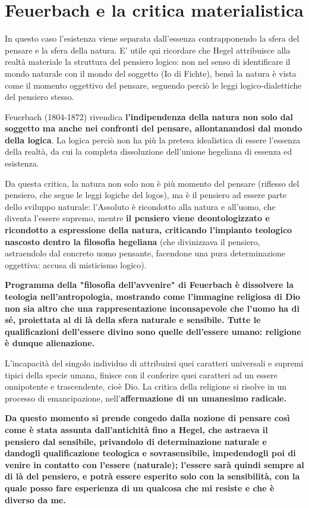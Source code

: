 \section{Feuerbach e la critica materialistica}

In questo caso l'esistenza viene separata dall'essenza contrapponendo la sfera del pensare e la sfera della natura. E' utile qui ricordare che Hegel attribuisce alla realtà materiale la struttura del pensiero logico: non nel senso di identificare il mondo naturale con il mondo del soggetto (Io di Fichte), bensì la natura è vista come il momento oggettivo del pensare, seguendo perciò le leggi logico-dialettiche del pensiero stesso.

Feuerbach (1804-1872) rivendica \textbf{l'indipendenza della natura non solo dal soggetto ma anche nei confronti del pensare, allontanandosi dal mondo della logica}. La logica perciò non ha più la pretesa idealistica di essere l'essenza della realtà, da cui la completa dissoluzione dell'unione hegeliana  di essenza ed esistenza.

Da questa critica, la natura non solo non è più momento del pensare (riflesso del pensiero, che segue le leggi logiche del logos), ma è il pensiero ad essere parte dello sviluppo naturale: l'Assoluto è ricondotto alla natura e all'uomo, che diventa l'essere supremo, mentre \textbf{il pensiero viene deontologizzato  e ricondotto a espressione della natura, criticando l'impianto teologico nascosto dentro la filosofia hegeliana }(che divinizzava il pensiero, astraendolo dal concreto uomo pensante, facendone una pura determinazione oggettiva: accusa di misticismo logico).

\textbf{Programma della "filosofia dell'avvenire" di Feuerbach  è dissolvere la teologia nell'antropologia, mostrando come l'immagine religiosa di Dio non sia altro che una rappresentazione inconsapevole che l'uomo ha di sé, proiettata al di là della sfera naturale e sensibile. Tutte le qualificazioni dell'essere divino sono quelle dell'essere umano: religione è dunque alienazione.}

L'incapacità del singolo individuo di attribuirsi quei caratteri universali e supremi tipici della specie umana, finisce con il conferire quei caratteri ad un essere onnipotente e trascendente, cioè Dio. La critica della religione si risolve in un processo di emancipazione, nell'\textbf{affermazione di un umanesimo radicale.}

\textbf{Da questo momento si prende congedo dalla nozione di pensare così come è stata assunta dall'antichità fino a Hegel, che astraeva il pensiero dal sensibile, privandolo di determinazione naturale e dandogli qualificazione teologica e sovrasensibile, impedendogli poi di venire in contatto con l'essere (naturale); l'essere sarà quindi sempre al di là del pensiero, e potrà essere esperito solo con la sensibilità, con la quale posso fare esperienza di un qualcosa che mi resiste e che è diverso da me.}

